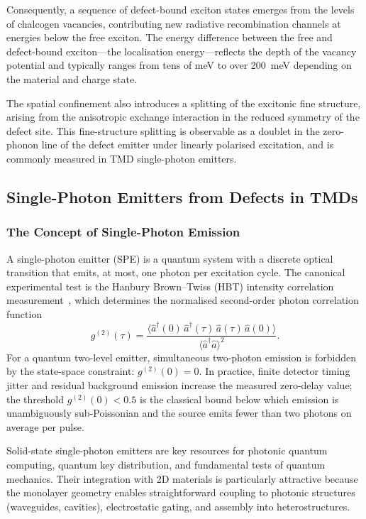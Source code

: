 Consequently, a sequence of defect-bound exciton states emerges from the levels of chalcogen vacancies, contributing new radiative recombination channels at energies below the free exciton.
The energy difference between the free and defect-bound exciton---the localisation energy---reflects the depth of the vacancy potential and typically ranges from tens of meV to over 200~meV depending on the material and charge state.

The spatial confinement also introduces a splitting of the excitonic fine structure, arising from the anisotropic exchange interaction in the reduced symmetry of the defect site.
This fine-structure splitting is observable as a doublet in the zero-phonon line of the defect emitter under linearly polarised excitation, and is commonly measured in TMD single-photon emitters.

\subsection{Single-Photon Emitters from Defects in TMDs}
\label{sub:chapKeyWord__subsection_3_3}

\subsubsection{The Concept of Single-Photon Emission}

A single-photon emitter (SPE) is a quantum system with a discrete optical transition that emits, at most, one photon per excitation cycle.
The canonical experimental test is the Hanbury Brown--Twiss (HBT) intensity correlation measurement~\cite{hanbury-1956}, which determines the normalised second-order photon correlation function
\begin{equation}
    g^{(2)}(\tau) = \frac{\langle \hat{a}^\dagger(0)\,\hat{a}^\dagger(\tau)\,\hat{a}(\tau)\,\hat{a}(0)\rangle}{\langle\hat{a}^\dagger\hat{a}\rangle^2}.
    \label{eq:g2}
\end{equation}
For a quantum two-level emitter, simultaneous two-photon emission is forbidden by the state-space constraint: $g^{(2)}(0) = 0$.
In practice, finite detector timing jitter and residual background emission increase the measured zero-delay value; the threshold $g^{(2)}(0) < 0.5$ is the classical bound below which emission is unambiguously sub-Poissonian and the source emits fewer than two photons on average per pulse.

Solid-state single-photon emitters are key resources for photonic quantum computing, quantum key distribution, and fundamental tests of quantum mechanics.
Their integration with 2D materials is particularly attractive because the monolayer geometry enables straightforward coupling to photonic structures (waveguides, cavities), electrostatic gating, and assembly into heterostructures.

